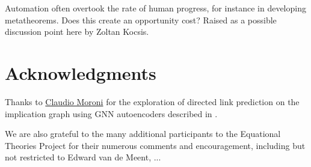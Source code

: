 Automation often overtook the rate of human progress, for instance in developing metatheorems. Does this create an opportunity cost? Raised as a possible discussion point here by Zoltan Kocsis.

\section*{Acknowledgments}

Thanks to \href{https://github.com/ClaudMor}{Claudio Moroni} for the exploration of directed link prediction
on the implication graph using GNN autoencoders described in .

We are also grateful to the many additional participants to the Equational Theories Project for their numerous comments and encouragement, including but not restricted to Edward van de Meent, ...
